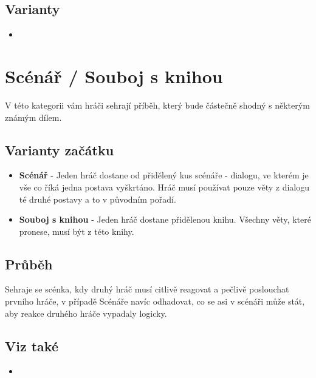  
\subsection{ Varianty } \begin{itemize}
\item  {}
\end{itemize}
 
 
 
\needspace{5cm} \section{Scénář / Souboj s knihou} \label{scénář / souboj s knihou}  
 
 
V této  kategorii  vám hráči sehrají příběh, který bude částečně shodný s  některým známým dílem. 
 
\subsection{Varianty začátku} \begin{itemize}
\item \textbf{Scénář}{} - Jeden hráč dostane od  přidělený kus scénáře - dialogu, ve kterém je vše co říká jedna postava vyškrtáno. Hráč musí používat pouze věty z dialogu té druhé postavy a to v původním pořadí.
\item \textbf{Souboj s knihou}{} - Jeden hráč dostane přidělenou knihu.  Všechny věty, které pronese, musí být  z této knihy.
\end{itemize}
 
\subsection{Průběh} Sehraje se scénka, kdy druhý hráč musí citlivě reagovat a pečlivě poslouchat prvního hráče, v případě Scénáře navíc odhadovat, co se asi v scénáři může stát, aby reakce druhého hráče vypadaly logicky. 
 
\subsection{Viz také} \begin{itemize}
\item  {}
\end{itemize}
 
 
 
